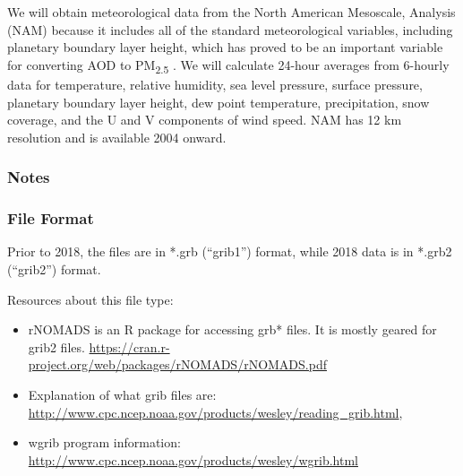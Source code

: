 We will obtain meteorological data from the North American Mesoscale, Analysis (NAM) because it includes all of the standard meteorological variables, including planetary boundary layer height, which has proved to be an important variable for converting AOD to PM\textsubscript{2.5} \citep{liu_estimating_2005}. We will calculate 24-hour averages from 6-hourly data for temperature, relative humidity, sea level pressure, surface pressure, planetary boundary layer height, dew point temperature, precipitation, snow coverage, and the U and V components of wind speed. NAM has 12 km resolution and is available 2004 onward.

\subsubsection*{Notes}


\subsubsection*{File Format}

Prior to 2018, the files are in *.grb (``grib1'') format, while 2018 data is in *.grb2 (``grib2'') format.

Resources about this file type: 
\begin{itemize}
\item rNOMADS is an R package for accessing grb* files. It is mostly geared for grib2 files. \url{https://cran.r-project.org/web/packages/rNOMADS/rNOMADS.pdf}
\item Explanation of what grib files are: \url{http://www.cpc.ncep.noaa.gov/products/wesley/reading_grib.html}, 
\item wgrib program information: \url{http://www.cpc.ncep.noaa.gov/products/wesley/wgrib.html}
\end{itemize}


